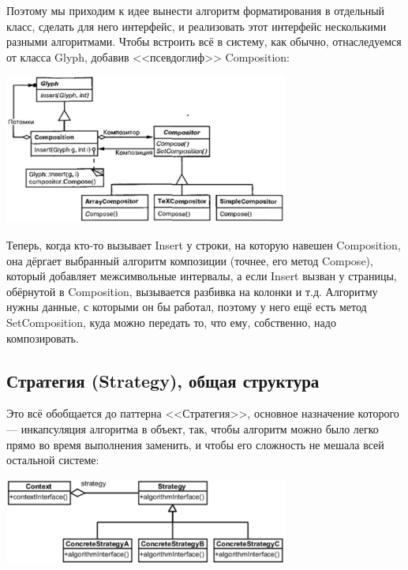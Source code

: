 \documentclass{../../text-style}
\begin{document}
Поэтому мы приходим к идее вынести алгоритм форматирования в отдельный класс, сделать для него интерфейс, и реализовать этот интерфейс несколькими разными алгоритмами. Чтобы встроить всё в систему, как обычно, отнаследуемся от класса Glyph, добавив <<псевдоглиф>> Composition:

\begin{center}
    \includegraphics[width=0.7\textwidth]{compositor.png}
\end{center}

Теперь, когда кто-то вызывает Insert у строки, на которую навешен Composition, она дёргает выбранный алгоритм композиции (точнее, его метод Compose), который добавляет межсимвольные интервалы, а если Insert вызван у страницы, обёрнутой в Composition, вызывается разбивка на колонки и т.д. Алгоритму нужны данные, с которыми он бы работал, поэтому у него ещё есть метод SetComposition, куда можно передать то, что ему, собственно, надо композировать.

\subsection{Стратегия (Strategy), общая структура}

Это всё обобщается до паттерна <<Стратегия>>, основное назначение которого --- инкапсуляция алгоритма в объект, так, чтобы алгоритм можно было легко прямо во время выполнения заменить, и чтобы его сложность не мешала всей остальной системе:

\begin{center}
    \includegraphics[width=0.7\textwidth]{strategy.png}
\end{center}
\end{document}

